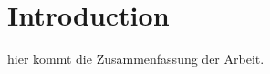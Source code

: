 \newpage 
\thispagestyle{empty} 
\hspace{1cm} 
\newpage

\chapter{Introduction}\label{intro}

\renewcommand{\thepage}{\arabic{page}}
\setcounter{page}{1}


hier kommt die Zusammenfassung der Arbeit.